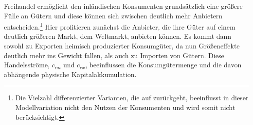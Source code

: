 %
Freihandel ermöglicht den inländischen Konsumenten grundsätzlich eine größere Fülle an Gütern und diese können sich zwischen deutlich mehr Anbietern entscheiden.\footnote{Die Vielzahl differenzierter Varianten, die auf \cite{Krugman.79} zurückgeht, beeinflusst in dieser Modellvariation nicht den Nutzen der Konsumenten und wird somit nicht berücksichtigt.} Hier profitieren zunächst die Anbieter, die ihre Güter auf einem deutlich größeren Markt, dem Weltmarkt, anbieten können. Es kommt dann sowohl zu Exporten heimisch produzierter Konsumgüter, da nun Größeneffekte deutlich mehr ins Gewicht fallen, als auch zu Importen von Gütern. Diese Handelsströme, $c_{im}$ und $c_{ex}$, beeinflussen die Konsumgütermenge und die davon abhängende physische Kapitalakkumulation.\\
%
